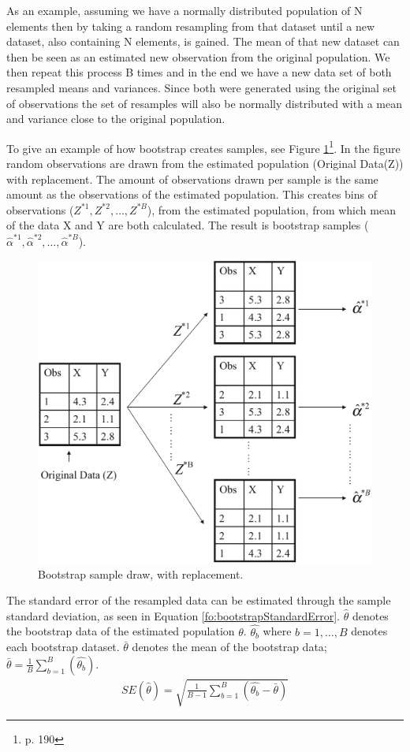As an example, assuming we have a normally distributed population of N elements then by taking a random resampling from that dataset until a new dataset, also containing N elements, is gained. The mean of that new dataset can then be seen as an estimated new observation from the original population. We then repeat this process B times and in the end we have a new data set of both resampled means and variances. Since both were generated using the original set of observations the set of resamples will also be normally distributed with a mean and variance close to the original population.
\fi

To give an example of how bootstrap creates samples, see Figure \ref{fig:bootstrapDrawWithReplacement}\footnote{\cite{James2013} p. 190}. In the figure random observations are drawn from the estimated population (Original Data(Z)) with replacement. The amount of observations drawn per sample is the same amount as the observations of the estimated population. This creates bins of observations ($Z^{*1}, Z^{*2},\ldots,Z^{*B}$), from the estimated population, from which mean of the data X and Y are both calculated. The result is bootstrap samples ($\hat\alpha^{*1}, \hat\alpha^{*2}, \ldots, \hat\alpha^{*B}$).

\begin{figure}[H]
	\centering
	\includegraphics[width=0.5\linewidth]{crossValidation/bootstrapDrawWithReplacement}
	\caption{Bootstrap sample draw, with replacement.}
	\label{fig:bootstrapDrawWithReplacement}
\end{figure}

The standard error of the resampled data can be estimated through the sample standard deviation, as seen in Equation \ref{fo:bootstrapStandardError}. $\hat{\theta}$ denotes the bootstrap data of the estimated population $\theta$. $\hat{\theta_{b}}$ where $b=1,\dots,B$ denotes each bootstrap dataset. $\bar{\theta}$ denotes the mean of the bootstrap data; $\bar{\theta} = \frac{1}{B} \sum_{b=1}^{B}(\hat{\theta_{b}})$.
\begin{align}\label{fo:bootstrapStandardError}
	SE(\hat{\theta}) = \sqrt{\frac{1}{B-1} \sum_{b=1}^{B}(\hat{\theta_{b}} - \bar{\theta})} 
\end{align}

